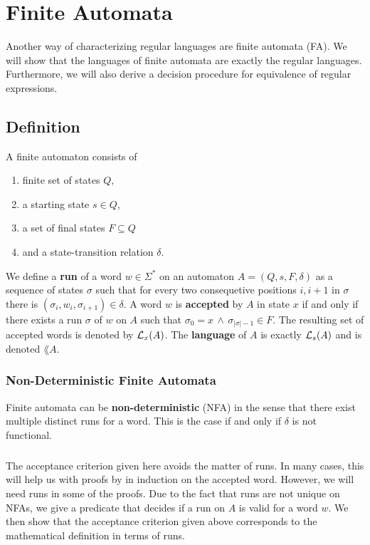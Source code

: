 
\chapter{Finite Automata}
\label{chap:FA}

Another way of characterizing regular languages are finite automata (FA)\cite{DBLP:books/daglib/0011126}. 
We will show that the languages of finite automata are exactly the regular languages. 
Furthermore, we will also derive a decision procedure for equivalence of regular expressions.

\section{Definition}
A finite automaton consists of
\begin{enumerate}
    \item
        finite set of states $Q$, 
    \item 
        a starting state $s \in Q$, 
    \item 
        a set of final states $F \subseteq Q$ 
    \item 
        and a state-transition relation $\delta$. 
\end{enumerate}

We define a \textbf{run} of a word $w \in \Sigma^*$ on an automaton $A = (Q, s, F, \delta)$ as a sequence of states $\sigma$ such that 
for every two consequetive positions $i,i+1$ in $\sigma$ there is 
$(\sigma_i, w_i, \sigma_{i+1}) \in \delta$.
A word $w$ is \textbf{accepted} by $A$ in state $x$ if and only if there exists a run $\sigma$ of $w$ on $A$ such that $\sigma_0 = x \, \wedge \, \sigma_{\vert\sigma\vert-1} \in F$.
The resulting set of accepted words is denoted by $\mathcal{L}_{x}(A)$.
The \textbf{language} of $A$ is exactly $\mathcal{L}_{s}(A)$ and is denoted $\lang{A}$. 

\subsection{Non-Deterministic Finite Automata}
Finite automata can be \textbf{non-deterministic} (NFA) in the sense that there exist multiple distinct runs for a word. 
This is the case if and only if $\delta$ is not functional.


\paragraph{}
The acceptance criterion given here avoids the matter of runs.
In many cases, this will help us with proofs by in induction on the accepted word.
However, we will need runs in some of the proofs.
Due to the fact that runs are not unique on NFAs, 
we give a predicate that decides if a run on $A$ is valid for a word $w$.
We then show that the acceptance criterion given above corresponds to the mathematical definition in terms of runs.

